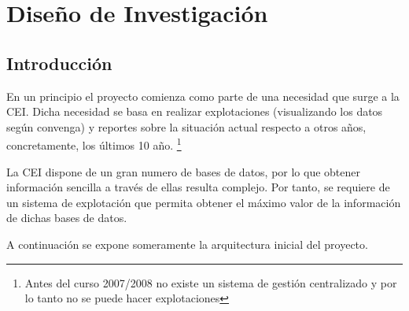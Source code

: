 \chapter{Diseño de Investigación}

\section{Introducción}
En un principio el proyecto comienza como parte de una necesidad que surge a la CEI. Dicha necesidad se basa en realizar explotaciones (visualizando los datos según convenga) y reportes sobre la situación actual respecto a otros años, concretamente, los últimos 10 año. \footnote{Antes del curso 2007/2008 no existe un sistema de gestión centralizado y por lo tanto no se puede hacer explotaciones}

La CEI dispone de un gran numero de bases de datos, por lo que obtener información sencilla a través de ellas resulta complejo. Por tanto, se requiere de un sistema de explotación que permita obtener el máximo valor de la información de dichas bases de datos.


A continuación se expone someramente la arquitectura inicial del proyecto.





